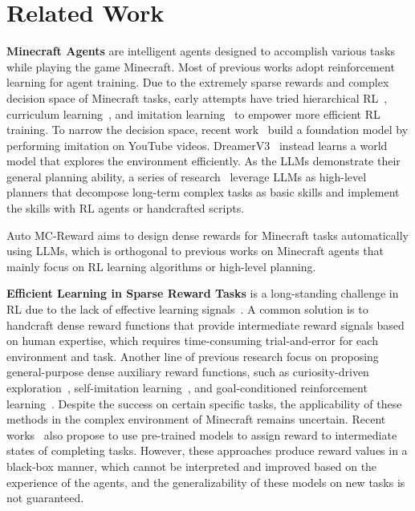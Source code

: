 \section{Related Work}
\label{sec:related}

\noindent\textbf{Minecraft Agents} are intelligent agents designed to accomplish various tasks while playing the game Minecraft. Most of previous works adopt reinforcement learning for agent training. Due to the extremely sparse rewards and complex decision space of Minecraft tasks, early attempts have tried hierarchical RL~\cite{tessler2017deep,mao2022seihai,lin2022juewu,skrynnik2021hierarchical}, curriculum learning~\cite{kanitscheider2021multi}, and imitation learning~\cite{amiranashvili2020scaling} to empower more efficient RL training. To narrow the decision space, recent work~\cite{baker2022video} build a foundation model by performing imitation on YouTube videos. DreamerV3~\cite{hafner2023mastering} instead learns a world model that explores the environment efficiently. As the LLMs demonstrate their general planning ability, a series of research~\cite{huang2022inner,wang2023describe,yuan2023plan4mc,zhu2023ghost,wang2023voyager} leverage LLMs as high-level planners that decompose long-term complex tasks as basic skills and implement the skills with RL agents or handcrafted scripts.

Auto MC-Reward aims to design dense rewards for Minecraft tasks automatically using LLMs, which is orthogonal to previous works on Minecraft agents that mainly focus on RL learning algorithms or high-level planning.

\vspace{0.5em}\noindent\textbf{Efficient Learning in Sparse Reward Tasks} is a long-standing challenge in RL due to the lack of effective learning signals~\cite{ladosz2022exploration}. A common solution is to handcraft dense reward functions that provide intermediate reward signals based on human expertise, which requires time-consuming trial-and-error for each environment and task. Another line of previous research focus on proposing general-purpose dense auxiliary reward functions, such as curiosity-driven exploration~\cite{jaderberg2016reinforcement,pathak2017curiosity,burda2018large,li2020random}, self-imitation learning~\cite{oh2018self}, and goal-conditioned reinforcement learning~\cite{andrychowicz2017hindsight,levy2017learning,kulkarni2016hierarchical,vezhnevets2017feudal}. Despite the success on certain specific tasks, the applicability of these methods in the complex environment of Minecraft remains uncertain. 
Recent works~\cite{fan2022minedojo,ma2022vip,ma2023liv,du2023vision,du2023guiding} also propose to use pre-trained models to assign reward to intermediate states of completing tasks. However, these approaches produce reward values in a black-box manner, which cannot be interpreted and improved based on the experience of the agents, and the generalizability of these models on new tasks is not guaranteed.

